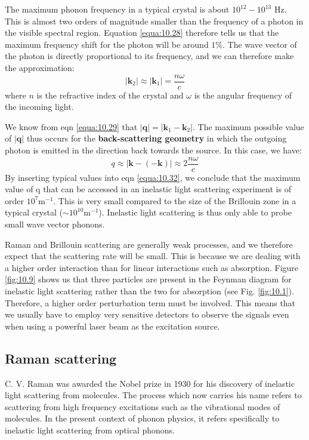 \documentclass[12pt]{book}
\begin{document}
The maximum phonon frequency in a typical crystal is about $10^{12} -10^{13}$ Hz. This is almost two orders of magnitude smaller than the frequency of a photon in the visible spectral region. Equation \ref{equa:10.28} therefore tells us that the maximum frequency shift for the photon will be around $1\%$. The wave vector of the photon is directly proportional to its frequency, and we can therefore make the approximation:
\begin{equation}\label{equa:10.31}
  |\mathbf{k}_2|\approx|\mathbf{k}_1|=\frac{n\omega}{c}
\end{equation}
where $n$ is the refractive index of the crystal and $\omega$ is the angular frequency of the incoming light.

We know from eqn \ref{equa:10.29} that $|\mathbf{q}|=|\mathbf{k}_1-\mathbf{k}_2|$. The maximum possible value of $|\mathbf{q}|$ thus occurs for the \textbf{back-scattering geometry} in which the outgoing photon is emitted in the direction back towards the source. In this case, we have:
\begin{equation}\label{equa:10.32}
  q\approx|\mathbf{k}-(-\mathbf{k})|\approx2\frac{n\omega}{c}
\end{equation}
By inserting typical values into eqn \ref{equa:10.32}, we conclude that the maximum value of q that can be accessed in an inelastic light scattering experiment is of order $10^7 \mathrm{m^{-1}}$. This is very small compared to the size of the Brillouin zone in a typical crystal ($\sim10^{10}\mathrm{m^{-1}}$). Inelastic light scattering is thus only able to probe small wave vector phonons.

Raman and Brillouin scattering are generally weak processes, and we therefore expect that the scattering rate will be small. This is because we are dealing with a higher order interaction than for linear interactions such as absorption. Figure \ref{fig:10.9} shows us that three particles are present in the Feynman diagram for inelastic light scattering rather than the two for absorption (see Fig. \ref{fig:10.1}). Therefore, a higher order perturbation term must be involved. This means that we usually have to employ very sensitive detectors to observe the signals even when using a powerful laser beam as the excitation source.

\subsection{Raman scattering}
C. V. Raman was awarded the Nobel prize in 1930 for his discovery of inelastic light scattering from molecules. The process which now carries his name refers to scattering from high frequency excitations such as the vibrational modes of molecules. In the present context of phonon physics, it refers specifically to inelastic light scattering from optical phonons.
\end{document}
